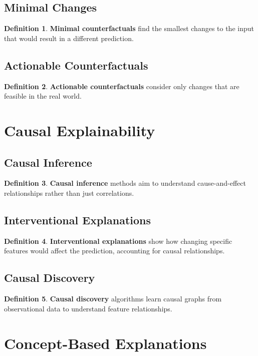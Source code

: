 \documentclass[11pt]{article}
\theoremstyle{definition}
\newtheorem{definition}{Definition}[section]
\begin{document}
\subsection{Minimal Changes}
\begin{definition}
\textbf{Minimal counterfactuals} find the smallest changes to the input that would result in a different prediction.
\end{definition}

\subsection{Actionable Counterfactuals}
\begin{definition}
\textbf{Actionable counterfactuals} consider only changes that are feasible in the real world.
\end{definition}

\section{Causal Explainability}

\subsection{Causal Inference}
\begin{definition}
\textbf{Causal inference} methods aim to understand cause-and-effect relationships rather than just correlations.
\end{definition}

\subsection{Interventional Explanations}
\begin{definition}
\textbf{Interventional explanations} show how changing specific features would affect the prediction, accounting for causal relationships.
\end{definition}

\subsection{Causal Discovery}
\begin{definition}
\textbf{Causal discovery} algorithms learn causal graphs from observational data to understand feature relationships.
\end{definition}

\section{Concept-Based Explanations}
\end{document}
